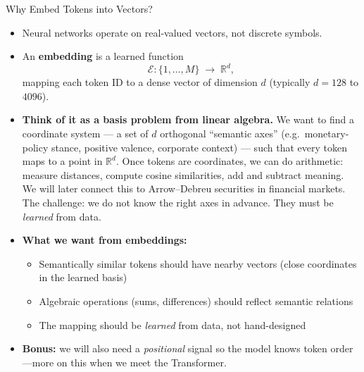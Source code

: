 \documentclass[10pt,english,aspectratio=169]{beamer}
\begin{document}
\begin{frame}{Why Embed Tokens into Vectors?}
\begin{itemize}
\item Neural networks operate on real-valued vectors, not discrete symbols.

\medskip
\item An \textbf{embedding} is a learned function
\[
   \mathcal{E}\colon \{1, \ldots, M\} \;\longrightarrow\; \mathbb{R}^{d},
\]
mapping each token ID to a dense vector of dimension $d$ (typically $d=128$ to $4096$).

\medskip
\item \textbf{Think of it as a basis problem from linear algebra.} We want to find a coordinate system --- a set of $d$ orthogonal ``semantic axes'' (e.g.\ monetary-policy stance, positive valence, corporate context) --- such that every token maps to a point in $\mathbb{R}^{d}$. Once tokens are coordinates, we can do arithmetic: measure distances, compute cosine similarities, add and subtract meaning. We will later connect this to Arrow--Debreu securities in financial markets. The challenge: we do not know the right axes in advance. They must be \emph{learned} from data.

\medskip
\item \textbf{What we want from embeddings:}
\begin{itemize}
    \item Semantically similar tokens should have nearby vectors (close coordinates in the learned basis)
    \item Algebraic operations (sums, differences) should reflect semantic relations
    \item The mapping should be \emph{learned} from data, not hand-designed
\end{itemize}

\medskip
\item \textbf{Bonus:} we will also need a \emph{positional} signal so the model knows token order---more on this when we meet the Transformer.
\end{itemize}
\end{frame}
\end{document}
